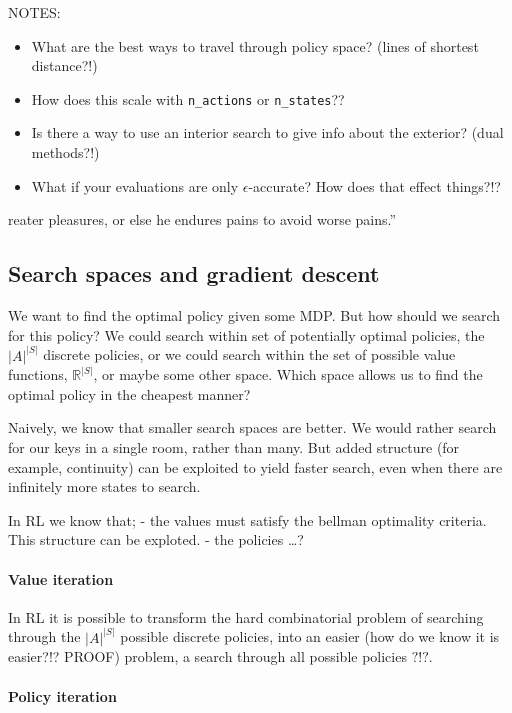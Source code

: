 NOTES:

\begin{itemize}
\item
  What are the best ways to travel through policy space? (lines of
  shortest distance?!)
\item
  How does this scale with \texttt{n\_actions} or \texttt{n\_states}??
\item
  Is there a way to use an interior search to give info about the
  exterior? (dual methods?!)
\item
  What if your evaluations are only \(\epsilon\)-accurate? How does that
  effect things?!?
\end{itemize}reater pleasures, or else he endures pains to avoid worse pains.''

\subsection{Search spaces and gradient descent}

We want to find the optimal policy given some MDP. But how should we
search for this policy? We could search within set of potentially
optimal policies, the \(|A|^{|S|}\) discrete policies, or we could
search within the set of possible value functions, \(\mathbb R^{|S|}\),
or maybe some other space. Which space allows us to find the optimal
policy in the cheapest manner?

Naively, we know that smaller search spaces are better. We would rather
search for our keys in a single room, rather than many. But added
structure (for example, continuity) can be exploited to yield faster
search, even when there are infinitely more states to search.

In RL we know that; - the values must satisfy the bellman optimality
criteria. This structure can be exploted. - the policies \ldots{}?

\paragraph{Value iteration}

In RL it is possible to transform the hard combinatorial problem of
searching through the \(|A|^{|S|}\) possible discrete policies, into an
easier (how do we know it is easier?!? PROOF) problem, a search through
all possible policies \(?!?\).


\paragraph{Policy iteration}

